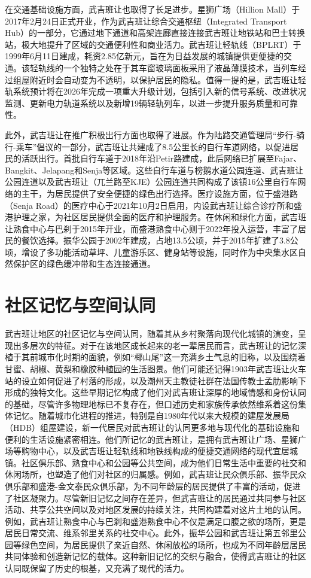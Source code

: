 \documentclass[11pt,a4paper,twoside,openany]{book}
\begin{document}
在交通基础设施方面，武吉班让也取得了长足进步。星狮广场（Hillion Mall）于2017年2月24日正式开业，作为武吉班让综合交通枢纽（Integrated Transport Hub）的一部分，它通过地下通道和高架连廊直接连接武吉班让地铁站和巴士转换站，极大地提升了区域的交通便利性和商业活力。武吉班让轻轨线（BPLRT）于1999年6月11日建成，耗资2.85亿新元，旨在为日益发展的城镇提供更便捷的交通。该轻轨线的一个独特之处在于其车窗玻璃面板采用了液晶薄膜技术，当列车经过组屋附近时会自动变为不透明，以保护居民的隐私。值得一提的是，武吉班让轻轨系统预计将在2026年完成一项重大升级计划，包括引入新的信号系统、改进状况监测、更新电力轨道系统以及新增19辆轻轨列车，以进一步提升服务质量和可靠性。

此外，武吉班让在推广积极出行方面也取得了进展。作为陆路交通管理局“步行-骑行-乘车”倡议的一部分，武吉班让共建成了8.5公里长的自行车道网络，以促进居民的活跃出行。首批自行车道于2018年沿Petir路建成，此后网络已扩展至Fajar、Bangkit、Jelapang和Senja等区域。这些自行车道与榜鹅水道公园连道、武吉班让公园连道以及武吉班让（兀兰路至KJE）公园连道共同构成了该镇16公里自行车网络的主干，为居民提供了安全便捷的绿色出行选择。医疗设施方面，位于盛港路（Senja Road）的医疗中心于2021年10月2日启用，内设武吉班让综合诊疗所和盛港护理之家，为社区居民提供全面的医疗和护理服务。在休闲和绿化方面，武吉班让熟食中心与巴刹于2015年开业，而盛港熟食中心则于2022年投入运营，丰富了居民的餐饮选择。振华公园于2002年建成，占地13.5公顷，并于2015年扩建了3.8公顷，增设了多功能活动草坪、儿童游乐区、健身站等设施，同时作为中央集水区自然保护区的绿色缓冲带和生态连接通道。

\section{社区记忆与空间认同}
武吉班让地区的社区记忆与空间认同，随着其从乡村聚落向现代化城镇的演变，呈现出多层次的特征。对于在该地区成长起来的老一辈居民而言，武吉班让的记忆深植于其前城市化时期的面貌，例如“椰山尾”这一充满乡土气息的旧称，以及围绕着甘蜜、胡椒、黄梨和橡胶种植园的生活图景。他们可能还记得1903年武吉班让火车站的设立如何促进了村落的形成，以及潮州天主教徒社群在法国传教士孟肋影响下形成的独特文化。这些早期记忆构成了他们对武吉班让深厚的地域情感和身份认同的基础，尽管许多物理地标已不复存在，但口述历史和家族传承依然维系着这份集体记忆。随着城市化进程的推进，特别是自1980年代以来大规模的建屋发展局（HDB）组屋建设，新一代居民对武吉班让的认同更多地与现代化的基础设施和便利的生活设施紧密相连。他们所记忆的武吉班让，是拥有武吉班让广场、星狮广场等购物中心，以及武吉班让轻轨线和地铁线构成的便捷交通网络的现代宜居城镇。社区俱乐部、熟食中心和公园等公共空间，成为他们日常生活中重要的社交和休闲场所，也塑造了他们对社区的归属感。例如，武吉班让民众俱乐部、振华民众俱乐部和盛港-金文泰民众俱乐部，为不同年龄层的居民提供了丰富的活动，促进了社区凝聚力。尽管新旧记忆之间存在差异，但武吉班让的居民通过共同参与社区活动、共享公共空间以及对地区发展的持续关注，共同构建着对这片土地的认同。例如，武吉班让熟食中心与巴刹和盛港熟食中心不仅是满足口腹之欲的场所，更是居民日常交流、维系邻里关系的社交中心。此外，振华公园和武吉班让第五邻里公园等绿色空间，为居民提供了亲近自然、休闲放松的场所，也成为不同年龄层居民共同体验和创造新记忆的载体。这种新旧记忆的交织与融合，使得武吉班让的社区认同既保留了历史的根基，又充满了现代的活力。
\end{document}
